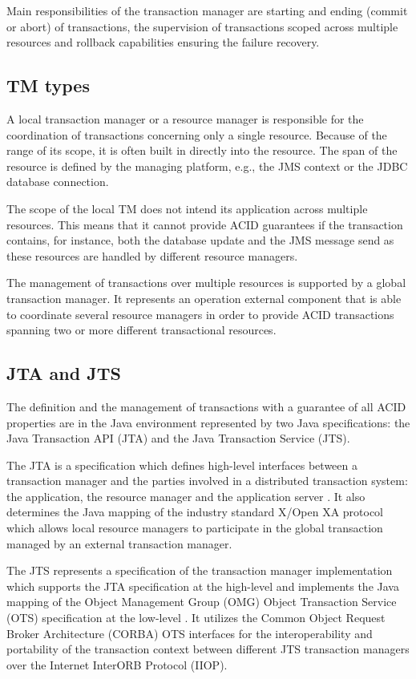 \documentclass[oneside,
  digital, %
  table,   %
  lof,     %
  lot,     %
]{fithesis3}
\begin{document}
Main responsibilities of the transaction manager are starting and ending (commit or abort) of transactions, the supervision of transactions scoped across multiple resources and rollback capabilities ensuring the failure recovery. 

\subsection{TM types}

A local transaction manager or a resource manager is responsible for the coordination of transactions concerning only a single resource. Because of the range of its scope, it is often built in directly into the resource. The span of the resource is defined by the managing platform, e.g., the JMS context or the JDBC database connection.  

The scope of the local TM does not intend its application across multiple resources. This means that it cannot provide ACID guarantees if the transaction contains, for instance, both the database update and the JMS message send as these resources are handled by different resource managers.

The management of transactions over multiple resources is supported by a global transaction manager. It represents an operation external component that is able to coordinate several resource managers in order to provide ACID transactions spanning two or more different transactional resources.

\subsection{JTA and JTS}

The definition and the management of transactions with a guarantee of all ACID properties are in the Java environment represented by two Java specifications: the Java Transaction API (JTA) and the Java Transaction Service (JTS). 

The JTA is a specification which defines high-level interfaces between a transaction manager and the parties involved in a distributed transaction system: the application, the resource manager and the application server \cite{jta}. It also determines the Java mapping of the industry standard X/Open XA protocol which allows local resource managers to participate in the global transaction managed by an external transaction manager.

The JTS represents a specification of the transaction manager implementation which supports the JTA specification at the high-level and implements the Java mapping of the Object Management Group (OMG) Object Transaction Service (OTS) specification at the low-level \cite{jts}. It utilizes the Common Object Request Broker Architecture (CORBA) OTS interfaces for the interoperability and portability of the transaction context between different JTS transaction managers over the Internet InterORB Protocol (IIOP).
\end{document}
